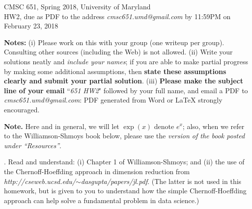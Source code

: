 \documentclass{article}[11pt]
\begin{document}
\newcommand{\E}{\textbf{E}}
\newcommand{\var}{\textbf{var}}

\begin{center}
CMSC 651, Spring 2018, University of Maryland \\
HW2, due as PDF to the address \emph{cmsc651.umd@gmail.com} by 11:59PM on February 23, 2018
\end{center}

\medskip \noindent
\textbf{Notes:} (i) Please work on this with your group (one writeup per group). Consulting
other sources (including the Web) is not allowed. 
(ii) Write your solutions neatly and \emph{include your names}; if you are able to make partial progress by making some
additional assumptions, then \textbf{state these assumptions clearly and submit
your partial solution}. 
(iii) \textbf{Please make the subject line of your email} ``\textit{651 HW2}" followed by
your full name, and email a PDF to \emph{cmsc651.umd@gmail.com}: PDF generated from Word or LaTeX strongly encouraged. 

\medskip \smallskip \noindent \textbf{Note.} Here and in general, we will let $\exp(x)$ denote $e^x$; also, when we refer to the Williamson-Shmoys book below, please use the \emph{version of the book posted under ``Resources''}. 

\medskip {}. Read and understand: (i) Chapter 1 of Williamson-Shmoys; and (ii) the use of the Chernoff-Hoeffding approach in dimension reduction from \emph{http://cseweb.ucsd.edu/$\sim$dasgupta/papers/jl.pdf}. (The latter is not used in this homework, but is given to you to understand how the simple Chernoff-Hoeffding approach can help solve a fundamental problem in data science.) 
\end{document}
